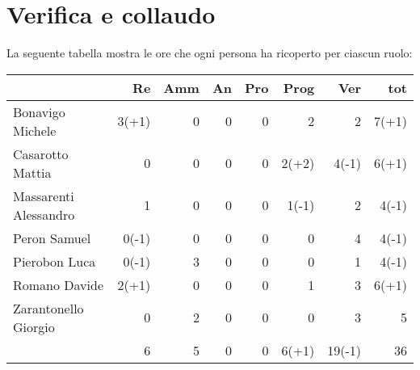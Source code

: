 \section{Verifica e collaudo}


La seguente tabella mostra le ore che ogni persona ha ricoperto per ciascun ruolo:
\begin{table}[ht]
    \begin{tabularx}{\linewidth}{X|rrrrrrr}
    \rowcolor{gray!30}& Re & Amm & An & Pro & Prog & Ver & tot \\
    \hline
    Bonavigo Michele                        & 3(+1)    & 0          & 0       & 0     & 2       & 2       & 7(+1) \\

    \rowcolor{gray!10}Casarotto Mattia      & 0        & 0          & 0       & 0     & 2(+2)   & 4(-1)   & 6(+1) \\

    Massarenti Alessandro                   & 1        & 0          & 0       & 0     & 1(-1)   & 2       & 4(-1) \\ 

    \rowcolor{gray!10}Peron Samuel          & 0(-1)    & 0          & 0       & 0     & 0       & 4       & 4(-1) \\ 

    Pierobon Luca                           & 0(-1)    & 3          & 0       & 0     & 0       & 1       & 4(-1) \\ 

    \rowcolor{gray!10}Romano Davide         & 2(+1)    & 0          & 0       & 0     & 1       & 3       & 6(+1)\\

    Zarantonello Giorgio                    & 0        & 2          & 0       & 0     & 0       & 3       & 5\\

    \hline                                  & 6        & 5          & 0       & 0     & 6(+1)   & 19(-1)  & 36\\  
    \end{tabularx}
\end{table}

